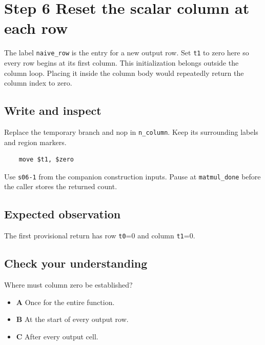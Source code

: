 \section{Step 6 Reset the scalar column at each row}\label{matmul-s06}

The label \texttt{naive\_row} is the entry for a new output row. Set \texttt{t1} to zero here so every row begins at its first column. This initialization belongs outside the column loop. Placing it inside the column body would repeatedly return the column index to zero.

\subsection{Write and inspect}
Replace the temporary branch and nop in \texttt{n\_column}. Keep its surrounding labels and region markers.

\begin{verbatim}
    move $t1, $zero
\end{verbatim}
Use \texttt{s06-1} from the companion construction inputs. Pause at \texttt{matmul\_done} before the caller stores the returned count.

\subsection{Expected observation}
The first provisional return has row \texttt{t0}=0 and column \texttt{t1}=0.

\subsection{Check your understanding}
Where must column zero be established?

\begin{itemize}
\item \textbf{A} Once for the entire function.
\item \textbf{B} At the start of every output row.
\item \textbf{C} After every output cell.
\end{itemize}
